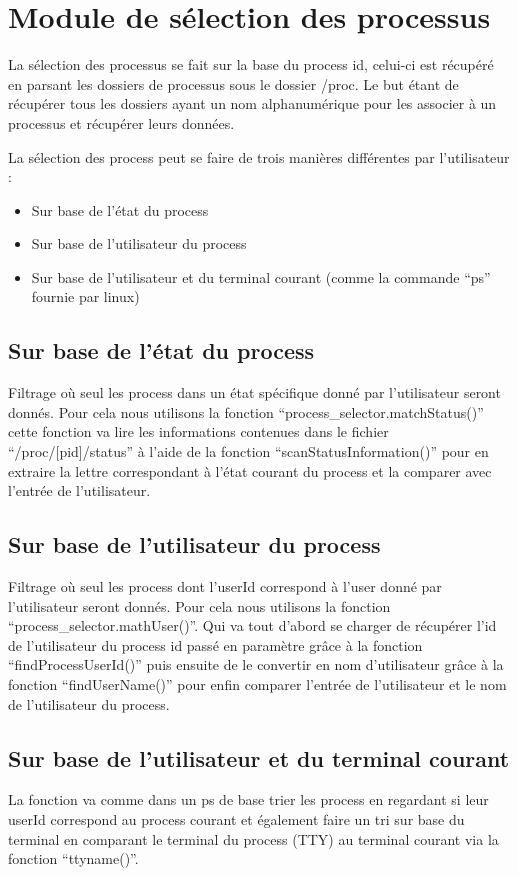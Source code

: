 \section{Module de sélection des processus}
La sélection des processus se fait sur la base du process id, celui-ci est récupéré en parsant les dossiers de processus sous le dossier /proc. Le but étant de récupérer tous les dossiers ayant un nom alphanumérique pour les associer à un processus et récupérer leurs données. 

La sélection des process peut se faire de trois manières différentes par l’utilisateur :

\begin{itemize}
\item Sur base de l’état du process
\item Sur base de l’utilisateur du process
\item Sur base de l’utilisateur et du terminal courant (comme la commande “ps” 
fournie par linux)
\end{itemize}

\subsection{Sur base de l'état du process} 
Filtrage où seul les process dans un état spécifique donné par l’utilisateur seront donnés. Pour cela nous utilisons la fonction “process\_selector.matchStatus()” cette fonction va lire les informations contenues dans le fichier “/proc/[pid]/status” à l’aide de la fonction “scanStatusInformation()” pour en extraire la lettre correspondant à l’état courant du process et la comparer avec l’entrée de l’utilisateur.

\subsection{Sur base de l’utilisateur du process}
Filtrage où seul les process dont l’userId correspond à l’user donné par l’utilisateur seront donnés. Pour cela nous utilisons la fonction “process\_selector.mathUser()”. Qui va tout d’abord se charger de récupérer l’id de l’utilisateur du process id passé en paramètre grâce à la fonction “findProcessUserId()” puis ensuite de le convertir en nom d’utilisateur grâce à la fonction “findUserName()” pour enfin comparer l’entrée de l’utilisateur et le nom de l’utilisateur du process.

\subsection{Sur base de l’utilisateur et du terminal courant} 
La fonction va comme dans un ps de base trier les process en regardant si leur userId correspond au process courant et également faire un tri sur base du terminal en comparant le terminal du process (TTY) au terminal courant via la fonction “ttyname()”. 